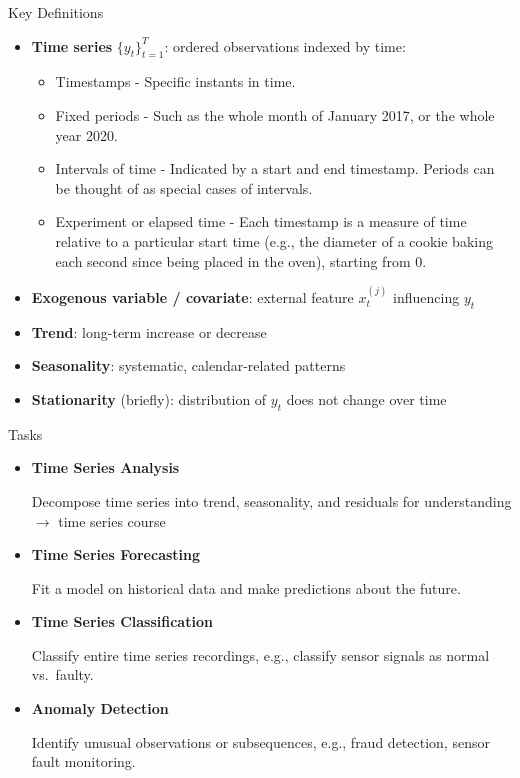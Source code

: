 \documentclass[11pt,compress,t,notes=noshow, xcolor=table]{beamer}
\begin{document}
\begin{vbframe}{Key Definitions}
  \begin{itemize}
    \item \textbf{Time series} $\{y_t\}_{t=1}^{T}$: ordered observations indexed by time:
    \begin{itemize}
        \item Timestamps - Specific instants in time.
        \item Fixed periods - Such as the whole month of January 2017, or the whole year 2020.
        \item Intervals of time - Indicated by a start and end timestamp. Periods can be thought of as special cases of intervals.
        \item Experiment or elapsed time - Each timestamp is a measure of time relative to a particular start time (e.g., the diameter of a cookie baking each second since being placed in the oven), starting from 0.
    \end{itemize}
    \item \textbf{Exogenous variable / covariate}: external feature $x^{(j)}_t$ influencing $y_t$
    \item \textbf{Trend}: long-term increase or decrease
    \item \textbf{Seasonality}: systematic, calendar-related patterns
    \item \textbf{Stationarity} (briefly): distribution of $y_t$ does not change over time
  \end{itemize}
\end{vbframe}

\begin{vbframe}{Tasks}
\vfill
    \begin{itemize}
        \item \textbf{Time Series Analysis}

        Decompose time series into trend, seasonality, and residuals for understanding $\rightarrow$ time series course

        \item \textbf{Time Series Forecasting}

        Fit a model on historical data and make predictions about the future.

        \item \textbf{Time Series Classification}

        Classify entire time series recordings, e.g., classify sensor signals as normal vs.\ faulty.

        \item \textbf{Anomaly Detection}

        Identify unusual observations or subsequences, e.g., fraud detection, sensor fault monitoring.
    \end{itemize}
\vfill
\end{vbframe}
\end{document}
